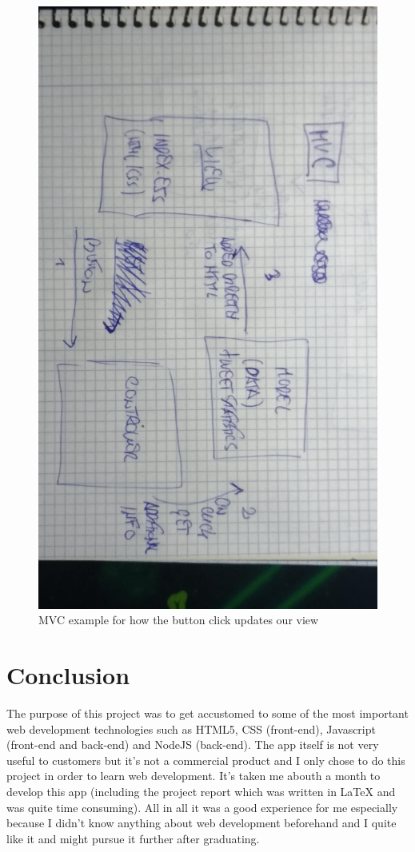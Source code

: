 \documentclass[12pt]{article} %
\begin{document}
	\begin{figure}[H] %
	\includegraphics[width=0.7\linewidth]{images/MVC}
	\caption{MVC example for how the button click updates our view}
	\label{MVC)}
	\end{figure}

	

		

\section{Conclusion} %

\noindent The purpose of this project was to get accustomed to some of the most important web development technologies such as HTML5, CSS (front-end), 
Javascript (front-end and back-end) and NodeJS (back-end). The app itself is not very useful to customers but it's not a commercial product and I only chose to do this project
in order to learn web development. 
It's taken me abouth a month to develop this app (including the project report which was written in LaTeX and was quite time consuming). All in all it was a good experience for me especially because I didn't know anything about web development beforehand and I quite like it and might pursue it further after graduating.
\end{document}
